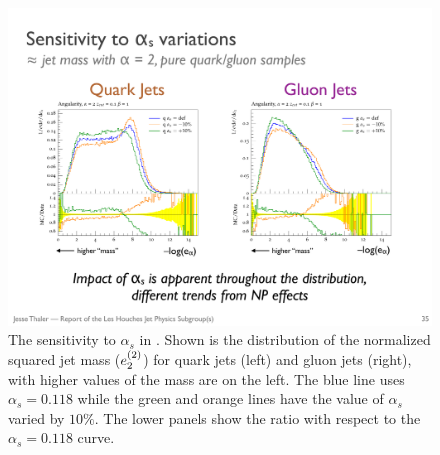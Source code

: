 \begin{figure}[t]
\begin{center}
\includegraphics[width = 0.99\columnwidth]{figures/sensitivity.pdf}
\end{center}
\caption{The sensitivity to $\alpha_s$ in \herwig.  Shown is the distribution of the normalized squared jet mass ($e_{2}^{(2)}$) for quark jets (left) and gluon jets (right), with higher values of the mass are on the left.  The blue line uses $\alpha_s=0.118$ while the green and orange lines have the value of $\alpha_s$ varied by $10\%$.  The lower panels show the ratio with respect to the $\alpha_s=0.118$ curve.}
\label{fig:sensitivity}
\end{figure}

